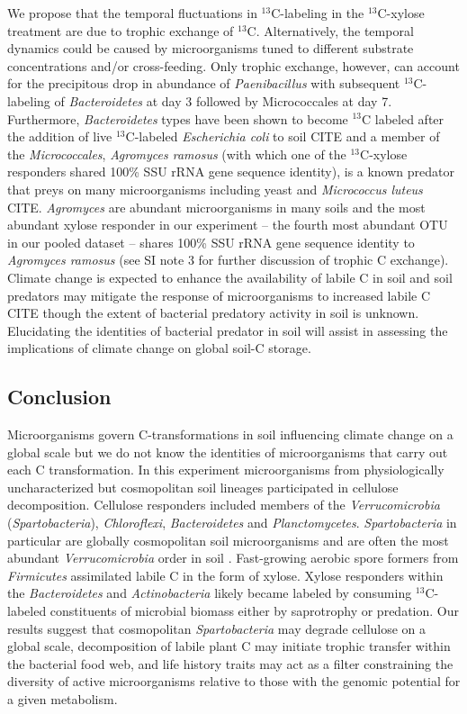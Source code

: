 We propose that the temporal fluctuations in $^{13}$C-labeling in the
$^{13}$C-xylose treatment are due to trophic exchange of $^{13}$C.
Alternatively, the temporal dynamics could be caused by microorganisms tuned to
different substrate concentrations and/or cross-feeding. Only trophic exchange,
however, can account for the precipitous drop in abundance of
\textit{Paenibacillus} with subsequent $^{13}$C-labeling of
\textit{Bacteroidetes} at day 3 followed by Micrococcales at day 7.
Furthermore, \textit{Bacteroidetes} types have been shown to become $^{13}$C
labeled after the addition of live $^{13}$C-labeled \textit{Escherichia coli}
to soil CITE and a member of the \textit{Micrococcales}, \textit{Agromyces
ramosus} (with which one of the $^{13}$C-xylose responders shared 100\% SSU
rRNA gene sequence identity), is a known predator that preys on many
microorganisms including yeast and \textit{Micrococcus luteus} CITE.
\textit{Agromyces} are abundant microorganisms in many soils and the most
abundant xylose responder in our experiment -- the fourth most abundant OTU in
our pooled dataset -- shares 100\% SSU rRNA gene sequence identity to
\textit{Agromyces ramosus} (see SI note 3 for further discussion of trophic C
exchange). Climate change is expected to enhance the availability of labile C
in soil and soil predators may mitigate the response of microorganisms to
increased labile C CITE though the extent of bacterial predatory activity in
soil is unknown. Elucidating the identities of bacterial predator in soil will
assist in assessing the implications of climate change on global soil-C
storage.

\subsection{Conclusion} 
Microorganisms govern C-transformations in soil influencing climate change on
a global scale but we do not know the identities of microorganisms that carry
out each C transformation. In this experiment microorganisms from physiologically
uncharacterized but cosmopolitan soil lineages participated in cellulose
decomposition. Cellulose responders included members of the
\textit{Verrucomicrobia} (\textit{Spartobacteria}), \textit{Chloroflexi},
\textit{Bacteroidetes} and \textit{Planctomycetes}. \textit{Spartobacteria} in
particular are globally cosmopolitan soil microorganisms and are often the most
abundant \textit{Verrucomicrobia} order in soil \citep{Bergmann_2011}.
Fast-growing aerobic spore formers from \textit{Firmicutes} assimilated labile
C in the form of xylose. Xylose responders within the \textit{Bacteroidetes}
and \textit{Actinobacteria} likely became labeled by consuming $^{13}$C-labeled
constituents of microbial biomass either by saprotrophy or predation. Our
results suggest that cosmopolitan \textit{Spartobacteria} may degrade cellulose
on a global scale, decomposition of labile plant C may initiate trophic transfer 
within the bacterial food web, and life history traits may act
as a filter constraining the diversity of active microorganisms relative to
those with the genomic potential for a given metabolism.
